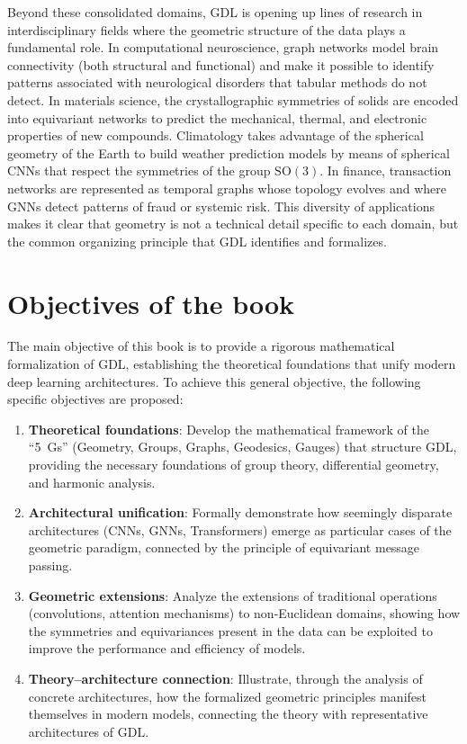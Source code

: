 Beyond these consolidated domains, \gls{GDL} is opening up lines of research in interdisciplinary fields where the geometric structure of the data plays a fundamental role. In computational neuroscience, graph networks model brain connectivity (both structural and functional) and make it possible to identify patterns associated with neurological disorders that tabular methods do not detect. In materials science, the crystallographic symmetries of solids are encoded into equivariant networks to predict the mechanical, thermal, and electronic properties of new compounds. Climatology takes advantage of the spherical geometry of the Earth to build weather prediction models by means of spherical \glspl{CNN} that respect the symmetries of the group $\text{SO}(3)$. In finance, transaction networks are represented as temporal graphs whose topology evolves and where \glspl{GNN} detect patterns of fraud or systemic risk. This diversity of applications makes it clear that geometry is not a technical detail specific to each domain, but the common organizing principle that \gls{GDL} identifies and formalizes.

\section{Objectives of the book}\label{sec:objetivos_trabajo}

The main objective of this book is to provide a rigorous mathematical formalization of \gls{GDL}, establishing the theoretical foundations that unify modern deep learning architectures. To achieve this general objective, the following specific objectives are proposed:

\begin{enumerate}
    \item \textbf{Theoretical foundations}: Develop the mathematical framework of the ``5~Gs'' (Geometry, Groups, Graphs, Geodesics, Gauges) that structure \gls{GDL}, providing the necessary foundations of group theory, differential geometry, and harmonic analysis.

    \item \textbf{Architectural unification}: Formally demonstrate how seemingly disparate architectures (\glspl{CNN}, \glspl{GNN}, \glspl{Transformer}) emerge as particular cases of the geometric paradigm, connected by the principle of equivariant message passing.

    \item \textbf{Geometric extensions}: Analyze the extensions of traditional operations (convolutions, attention mechanisms) to non-Euclidean domains, showing how the symmetries and equivariances present in the data can be exploited to improve the performance and efficiency of models.

    \item \textbf{Theory--architecture connection}: Illustrate, through the analysis of concrete architectures, how the formalized geometric principles manifest themselves in modern models, connecting the theory with representative architectures of \gls{GDL}.
\end{enumerate}

